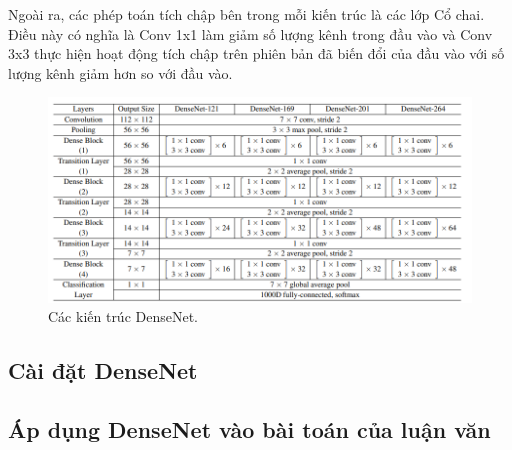 Ngoài ra, các phép toán tích chập bên trong mỗi kiến trúc là các lớp Cổ chai. Điều này có nghĩa là Conv 1x1 làm giảm số lượng kênh trong đầu vào và Conv 3x3 thực hiện hoạt động tích chập trên phiên bản đã biến đổi của đầu vào với số lượng kênh giảm hơn so với đầu vào.
\begin{figure}[H]
	\centering
	\includegraphics[width=1\linewidth]{images/densenet_archtectures_for_imagenet}
	\caption{Các kiến trúc DenseNet.}
	\label{fig:densenet_archtectures_for_imagenet}
\end{figure}

\subsection{Cài đặt DenseNet}


\subsection{Áp dụng DenseNet vào bài toán của luận văn}
